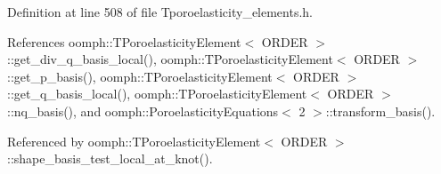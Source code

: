 Definition at line 508 of file Tporoelasticity\+\_\+elements.\+h.



References oomph\+::\+T\+Poroelasticity\+Element$<$ O\+R\+D\+E\+R $>$\+::get\+\_\+div\+\_\+q\+\_\+basis\+\_\+local(), oomph\+::\+T\+Poroelasticity\+Element$<$ O\+R\+D\+E\+R $>$\+::get\+\_\+p\+\_\+basis(), oomph\+::\+T\+Poroelasticity\+Element$<$ O\+R\+D\+E\+R $>$\+::get\+\_\+q\+\_\+basis\+\_\+local(), oomph\+::\+T\+Poroelasticity\+Element$<$ O\+R\+D\+E\+R $>$\+::nq\+\_\+basis(), and oomph\+::\+Poroelasticity\+Equations$<$ 2 $>$\+::transform\+\_\+basis().



Referenced by oomph\+::\+T\+Poroelasticity\+Element$<$ O\+R\+D\+E\+R $>$\+::shape\+\_\+basis\+\_\+test\+\_\+local\+\_\+at\+\_\+knot().

\mbox{\label{classoomph_1_1TPoroelasticityElement_a26cc12dec0a90720215f1d12d60ce936}} 
